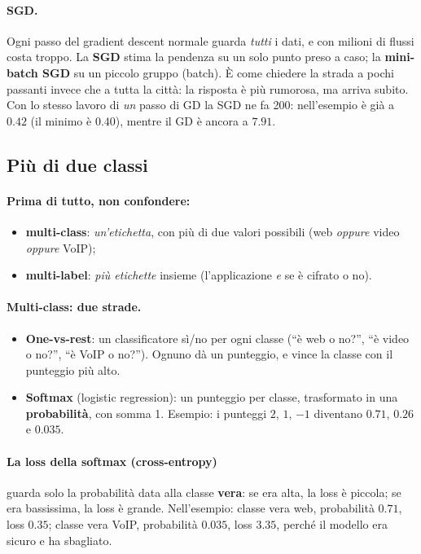 \paragraph*{SGD.} Ogni passo del gradient descent normale guarda \emph{tutti} i dati, e con milioni di flussi costa troppo. La \textbf{SGD} stima la pendenza su un solo punto preso a caso; la \textbf{mini-batch SGD} su un piccolo gruppo (batch). È come chiedere la strada a pochi passanti invece che a tutta la città: la risposta è più rumorosa, ma arriva subito. Con lo stesso lavoro di \emph{un} passo di GD la SGD ne fa 200: nell'esempio è già a $0.42$ (il minimo è $0.40$), mentre il GD è ancora a $7.91$.

\subsection{Più di due classi}
\paragraph*{Prima di tutto, non confondere:}
\begin{itemize}
    \item \textbf{multi-class}: \emph{un'etichetta}, con più di due valori possibili (web \emph{oppure} video \emph{oppure} VoIP);
    \item \textbf{multi-label}: \emph{più etichette} insieme (l'applicazione \emph{e} se è cifrato o no).
\end{itemize}

\paragraph*{Multi-class: due strade.}
\begin{itemize}
    \item \textbf{One-vs-rest}: un classificatore sì/no per ogni classe (``è web o no?'', ``è video o no?'', ``è VoIP o no?''). Ognuno dà un punteggio, e vince la classe con il punteggio più alto.
    \item \textbf{Softmax} (logistic regression): un punteggio per classe, trasformato in una \textbf{probabilità}, con somma 1. Esempio: i punteggi $2$, $1$, $-1$ diventano $0.71$, $0.26$ e $0.035$.
\end{itemize}

\paragraph*{La loss della softmax (cross-entropy)} guarda solo la probabilità data alla classe \textbf{vera}: se era alta, la loss è piccola; se era bassissima, la loss è grande. Nell'esempio: classe vera web, probabilità $0.71$, loss $0.35$; classe vera VoIP, probabilità $0.035$, loss $3.35$, perché il modello era sicuro e ha sbagliato.

